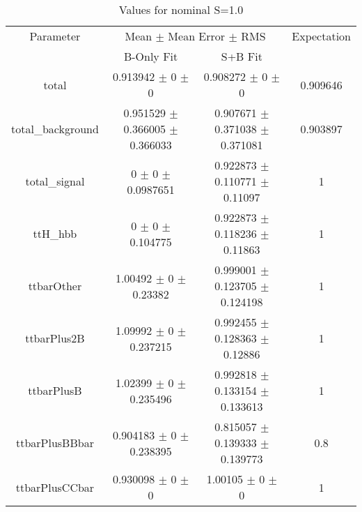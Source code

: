 \begin{table}
\centering
\caption{Values for nominal S=1.0}
\begin{tabular}{cccc}
\toprule
Parameter & \multicolumn{2}{c}{Mean $\pm$ Mean Error $\pm$ RMS} & Expectation\\
 & B-Only Fit & S+B Fit & \\
\midrule
total & \num{0.913942} $\pm$ \num{0} $\pm$ \num{0} & \num{0.908272} $\pm$ \num{0} $\pm$ \num{0} & \num{0.909646}\\
total\_background & \num{0.951529} $\pm$ \num{0.366005} $\pm$ \num{0.366033} & \num{0.907671} $\pm$ \num{0.371038} $\pm$ \num{0.371081} & \num{0.903897}\\
total\_signal & \num{0} $\pm$ \num{0} $\pm$ \num{0.0987651} & \num{0.922873} $\pm$ \num{0.110771} $\pm$ \num{0.11097} & \num{1}\\
ttH\_hbb & \num{0} $\pm$ \num{0} $\pm$ \num{0.104775} & \num{0.922873} $\pm$ \num{0.118236} $\pm$ \num{0.11863} & \num{1}\\
ttbarOther & \num{1.00492} $\pm$ \num{0} $\pm$ \num{0.23382} & \num{0.999001} $\pm$ \num{0.123705} $\pm$ \num{0.124198} & \num{1}\\
ttbarPlus2B & \num{1.09992} $\pm$ \num{0} $\pm$ \num{0.237215} & \num{0.992455} $\pm$ \num{0.128363} $\pm$ \num{0.12886} & \num{1}\\
ttbarPlusB & \num{1.02399} $\pm$ \num{0} $\pm$ \num{0.235496} & \num{0.992818} $\pm$ \num{0.133154} $\pm$ \num{0.133613} & \num{1}\\
ttbarPlusBBbar & \num{0.904183} $\pm$ \num{0} $\pm$ \num{0.238395} & \num{0.815057} $\pm$ \num{0.139333} $\pm$ \num{0.139773} & \num{0.8}\\
ttbarPlusCCbar & \num{0.930098} $\pm$ \num{0} $\pm$ \num{0} & \num{1.00105} $\pm$ \num{0} $\pm$ \num{0} & \num{1}\\
\bottomrule
\end{tabular}
\end{table}